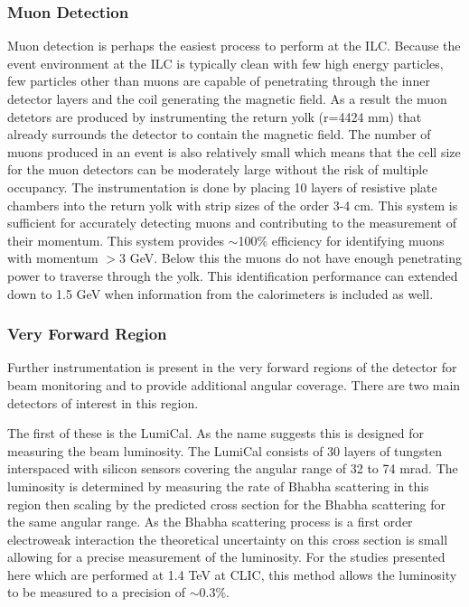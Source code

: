 \subsubsection{Muon Detection}
Muon detection is perhaps the easiest process to perform at the ILC. Because the event environment at the ILC is typically clean with few high energy particles, few particles other than muons are capable of penetrating through the inner detector layers and the coil generating the magnetic field. As a result the muon detetors are produced by instrumenting the return yolk (r=4424 mm) that already surrounds the detector to contain the magnetic field. The number of muons produced in an event is also relatively small which means that the cell size for the muon detectors can be moderately large without the risk of multiple occupancy. The instrumentation is done by placing 10 layers of resistive plate chambers into the return yolk with strip sizes of the order 3-4 cm. This system is sufficient for accurately detecting muons and contributing to the measurement of their momentum. This system provides $\sim$100\% efficiency for identifying muons with momentum $>$3 GeV. Below this the muons do not have enough penetrating power to traverse through the yolk. This identification performance can extended down to 1.5 GeV when information from the calorimeters is included as well.

\subsubsection{Very Forward Region}

Further instrumentation is present in the very forward regions of the detector for beam monitoring and to provide additional angular coverage. There are two main detectors of interest in this region.

The first of these is the LumiCal. As the name suggests this is designed for measuring the beam luminosity. The LumiCal consists of 30 layers of tungsten interspaced with silicon sensors covering the angular range of 32 to 74 mrad. The luminosity is determined by measuring the rate of Bhabha scattering in this region then scaling by the predicted cross section for the Bhabha scattering for the same angular range. As the Bhabha scattering process is a first order electroweak interaction the theoretical uncertainty on this cross section is small allowing for a precise measurement of the luminosity. For the studies presented here which are performed at 1.4 TeV at CLIC, this method allows the luminosity to be measured to a precision of $\sim$0.3\%.

